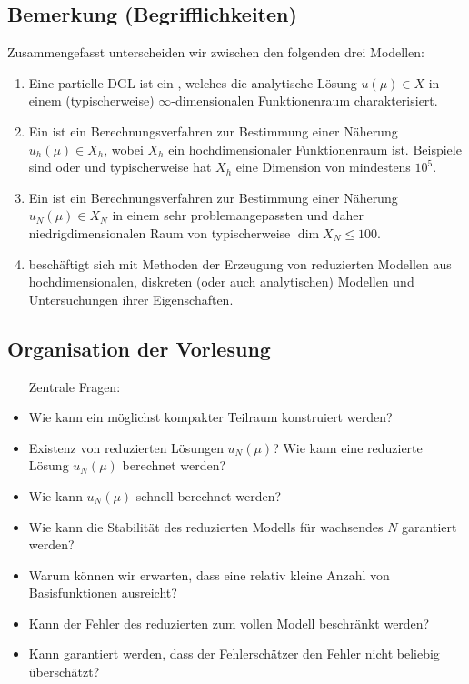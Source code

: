 \subsection{Bemerkung (Begrifflichkeiten)}
\label{sub:bem_begrifflichkeit}
Zusammengefasst unterscheiden wir zwischen den folgenden drei Modellen:
\begin{enumerate}[1)]
	\item Eine partielle DGL ist ein , welches die analytische Lösung $u(\mu)\in X$ in einem (typischerweise) $\infty$-dimensionalen Funktionenraum charakterisiert.
	\item Ein  ist ein Berechnungsverfahren zur Bestimmung einer Näherung $u_h(\mu)\in X_h$, wobei $X_h$ ein hochdimensionaler Funktionenraum ist.
	Beispiele sind  oder  und typischerweise hat $X_h$ eine Dimension von mindestens $10^5$.
	\item Ein  ist ein Berechnungsverfahren zur Bestimmung einer Näherung $u_N(\mu)\in X_N$ in einem sehr problemangepassten und daher niedrigdimensionalen Raum von typischerweise $\dim X_N \leq 100$.
	\item {} beschäftigt sich mit Methoden der Erzeugung von reduzierten Modellen aus hochdimensionalen, diskreten (oder auch analytischen) Modellen und Untersuchungen ihrer Eigenschaften.
\end{enumerate}

\subsection{Organisation der Vorlesung}
\label{sub:org}
\begin{itemize}
	\item[Zentrale Fragen:]
	\item {} Wie kann ein möglichst kompakter Teilraum konstruiert werden?
	\item {} Existenz von reduzierten Lösungen $u_N(\mu)$?
	Wie kann eine reduzierte Lösung $u_N(\mu)$ berechnet werden?
	\item {} Wie kann $u_N(\mu)$ schnell berechnet werden?
	\item {} Wie kann die Stabilität des reduzierten Modells für wachsendes $N$ garantiert werden?
	\item{} Warum können wir erwarten, dass eine relativ kleine Anzahl von Basisfunktionen ausreicht?
	\item {} Kann der Fehler des reduzierten zum vollen Modell beschränkt werden?
	\item {} Kann garantiert werden, dass der Fehlerschätzer den Fehler nicht beliebig überschätzt?
\end{itemize}

